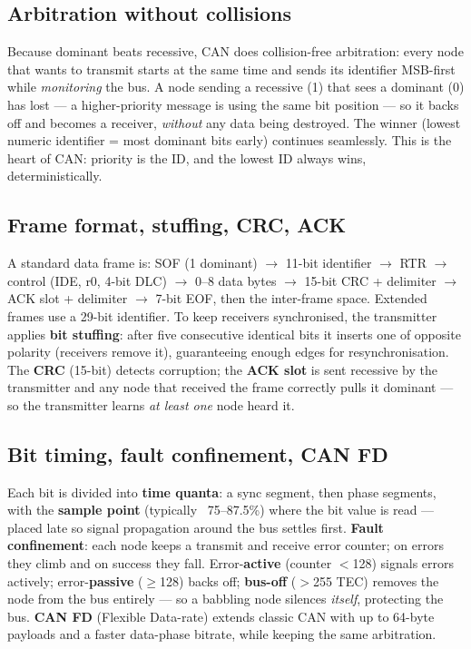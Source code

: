 \subsection{Arbitration without collisions}

Because dominant beats recessive, CAN does collision-free arbitration: every
node that wants to transmit starts at the same time and sends its identifier
MSB-first while \emph{monitoring} the bus. A node sending a recessive (1) that
sees a dominant (0) has lost --- a higher-priority message is using the same bit
position --- so it backs off and becomes a receiver, \emph{without} any data
being destroyed. The winner (lowest numeric identifier = most dominant bits
early) continues seamlessly. This is the heart of CAN: priority is the ID, and
the lowest ID always wins, deterministically.

\subsection{Frame format, stuffing, CRC, ACK}

A standard data frame is: SOF (1 dominant) $\rightarrow$ 11-bit identifier
$\rightarrow$ RTR $\rightarrow$ control (IDE, r0, 4-bit DLC) $\rightarrow$
0--8 data bytes $\rightarrow$ 15-bit CRC + delimiter $\rightarrow$ ACK slot +
delimiter $\rightarrow$ 7-bit EOF, then the inter-frame space. Extended frames
use a 29-bit identifier. To keep receivers synchronised, the transmitter applies
\textbf{bit stuffing}: after five consecutive identical bits it inserts one of
opposite polarity (receivers remove it), guaranteeing enough edges for
resynchronisation. The \textbf{CRC} (15-bit) detects corruption; the
\textbf{ACK slot} is sent recessive by the transmitter and any node that
received the frame correctly pulls it dominant --- so the transmitter learns
\emph{at least one} node heard it.

\subsection{Bit timing, fault confinement, CAN FD}

Each bit is divided into \textbf{time quanta}: a sync segment, then phase
segments, with the \textbf{sample point} (typically ~75--87.5\%) where the bit
value is read --- placed late so signal propagation around the bus settles
first. \textbf{Fault confinement}: each node keeps a transmit and receive error
counter; on errors they climb and on success they fall. Error-\textbf{active}
(counter $<$128) signals errors actively; error-\textbf{passive}
($\geq$128) backs off; \textbf{bus-off} ($>$255 TEC) removes the node from the
bus entirely --- so a babbling node silences \emph{itself}, protecting the bus.
\textbf{CAN FD} (Flexible Data-rate) extends classic CAN with up to 64-byte
payloads and a faster data-phase bitrate, while keeping the same arbitration.


